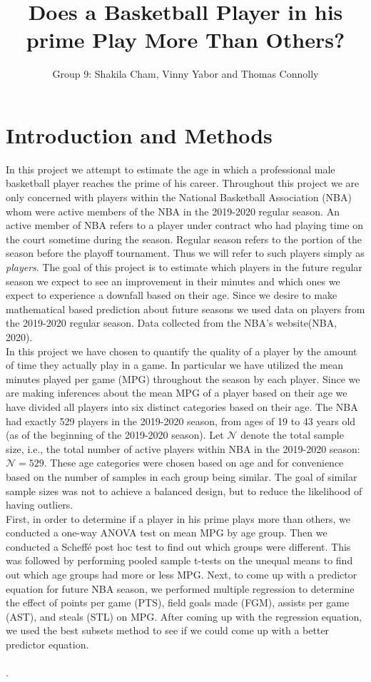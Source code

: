 \documentclass{article}
\title{Does a Basketball Player in his prime Play More Than Others?}
\author{Group 9: Shakila Cham, Vinny Yabor and Thomas Connolly}
\begin{document}
\maketitle
\section*{Introduction and Methods}

In this project we attempt to estimate the age in which a professional male basketball player reaches the prime of his career. Throughout this project we are only concerned with players within the National Basketball Association (NBA) whom were active members of the NBA in the 2019-2020 regular season. An active member of NBA refers to a player under contract who had playing time on the court sometime during the season. Regular season refers to the portion of the season before the playoff tournament. Thus we will refer to such players simply as \textit{players}. The goal of this project is to estimate which players in the future regular season we expect to see an improvement in their minutes and which ones we expect to experience a downfall based on their age. Since we desire to make mathematical based prediction about future seasons we used data on players from the 2019-2020 regular season. Data collected from the NBA's website(NBA, 2020). \\

In this project we have chosen to quantify the quality of a player by the amount of time they actually play in a game. In particular we have utilized the mean minutes played per game (MPG) throughout the season by each player. Since we are making inferences about the mean MPG of a player based on their age we have divided all players into six distinct categories based on their age. The NBA had exactly 529  players in the 2019-2020 season, from ages of 19 to 43 years old (as of the beginning of the 2019-2020 season). Let $\mathcal{N}$ denote the total sample size, i.e., the total number of active players within NBA in the 2019-2020 season: $\mathcal{N}=529$. These age categories were chosen based on age and for convenience based on the number of samples in each group being similar. The goal of similar sample sizes was not to achieve a balanced design, but to reduce the likelihood of having outliers. \\

First, in order to determine if a player in his prime plays more than others, we conducted a one-way ANOVA test on mean MPG by age group. Then we conducted a Scheffé post hoc test to find out which groups were different. This was followed by performing pooled sample t-tests on the unequal means to find out which age groups had more or less MPG. Next, to come up with a predictor equation for future NBA season, we performed multiple regression to determine the effect of points per game (PTS), field goals made (FGM), assists per game (AST), and steals (STL) on MPG. After coming up with the regression equation, we used the best subsets method to see if we could come up with a better predictor equation.\\\\
.\\\\
\end{document}
